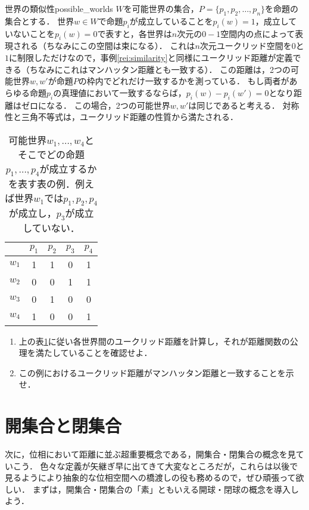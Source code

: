 \documentclass[11pt,a4paper, dvipdfmx]{jsarticle}
\begin{document}
\begin{rei}{世界の類似性}{possible_worlds}
$W$を可能世界の集合，$P = \{p_1, p_2, \dots, p_n\}$を命題の集合とする．
世界$w \in W$で命題$p_i$が成立していることを$p_i(w)=1$，成立していないことを$p_i(w)=0$で表すと，各世界は$n$次元の$0-1$空間内の点によって表現される（ちなみにこの空間は束になる）．
これは$n$次元ユークリッド空間を$0$と$1$に制限しただけなので，事例\ref{rei:similarity}と同様にユークリッド距離が定義できる（ちなみにこれはマンハッタン距離とも一致する）．
この距離は，2つの可能世界$w, w'$が命題$P$の枠内でどれだけ一致するかを測っている．
もし両者があらゆる命題$p_i$の真理値において一致するならば，$p_i(w) - p_i(w')=0$となり距離はゼロになる．
この場合，2つの可能世界$w, w'$は同じであると考える．
対称性と三角不等式は，ユークリッド距離の性質から満たされる．
\end{rei}
\begin{table}[htbp]
 \label{tb:possible_worlds}
 \caption{可能世界$w_1, \dots, w_4$とそこでどの命題$p_1, \dots, p_4$が成立するかを表す表の例．例えば世界$w_1$では$p_1, p_2, p_4$が成立し，$p_3$が成立していない．}
 \centering
 \begin{tabular}[tb]{ccccc}
      & $p_1$ & $p_2$ & $p_3$ & $p_4$ \\ \hline
$w_1$ &  1  &  1  &  0  &  1  \\
$w_2$ &  0  &  0  &  1  &  1  \\
$w_3$ &  0  &  1  &  0  &  0  \\
$w_4$ &  1  &  0  &  0  &  1  
 \end{tabular}
\end{table}

\begin{renshu}{}{}
\begin{enumerate}
 \item 上の表\ref{tb:possible_worlds}に従い各世界間のユークリッド距離を計算し，それが距離関数の公理を満たしていることを確認せよ．
 \item この例におけるユークリッド距離がマンハッタン距離と一致することを示せ．
\end{enumerate}
\end{renshu}

\section{開集合と閉集合}
次に，位相において距離に並ぶ超重要概念である，開集合・閉集合の概念を見ていこう．
色々な定義が矢継ぎ早に出てきて大変なところだが，これらは以後で見るようにより抽象的な位相空間への橋渡しの役も務めるので，ぜひ頑張って欲しい．
まずは，開集合・閉集合の「素」ともいえる開球・閉球の概念を導入しよう．
\end{document}
